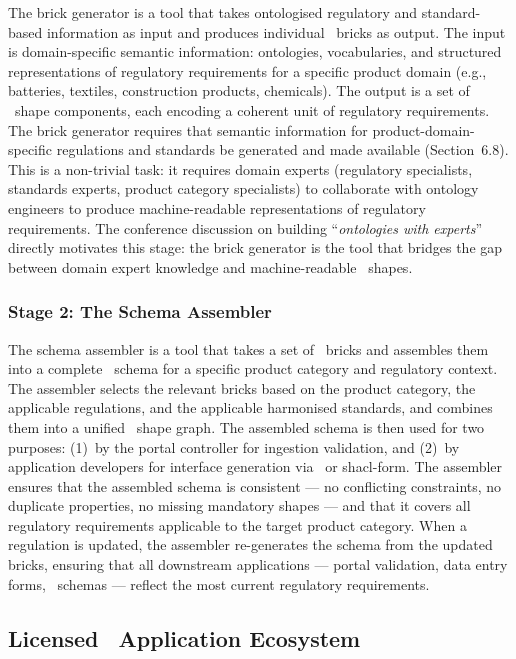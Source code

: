 The brick generator is a tool that takes ontologised regulatory and
standard-based information as input and produces individual \SHACL\ bricks as
output. The input is domain-specific semantic information: ontologies,
vocabularies, and structured representations of regulatory requirements for a
specific product domain (e.g., batteries, textiles, construction products,
chemicals). The output is a set of \SHACL\ shape components, each encoding a
coherent unit of regulatory requirements. The brick generator requires that
semantic information for product-domain-specific regulations and standards be
generated and made available (Section~6.8). This is a non-trivial task: it
requires domain experts (regulatory specialists, standards experts, product
category specialists) to collaborate with ontology engineers to produce
machine-readable representations of regulatory requirements. The conference
discussion on building ``\textit{ontologies with
experts}''~\cite{dpp4eu2026_day2} directly motivates this stage: the brick
generator is the tool that bridges the gap between domain expert knowledge and
machine-readable \SHACL\ shapes.

\subsubsection{Stage 2: The Schema Assembler}

The schema assembler is a tool that takes a set of \SHACL\ bricks and assembles
them into a complete \SHACL\ schema for a specific product category and
regulatory context. The assembler selects the relevant bricks based on the
product category, the applicable regulations, and the applicable harmonised
standards, and combines them into a unified \SHACL\ shape graph. The assembled
schema is then used for two purposes: (1)~by the portal controller for ingestion
validation, and (2)~by application developers for interface generation via
\DASH\ or shacl-form. The assembler ensures that the assembled schema is
consistent --- no conflicting constraints, no duplicate properties, no missing
mandatory shapes --- and that it covers all regulatory requirements applicable
to the target product category. When a regulation is updated, the assembler
re-generates the schema from the updated bricks, ensuring that all downstream
applications --- portal validation, data entry forms, \API\ schemas --- reflect
the most current regulatory requirements.

\subsection{Licensed \DPP\ Application Ecosystem}
\label{sec:licensed-apps}

